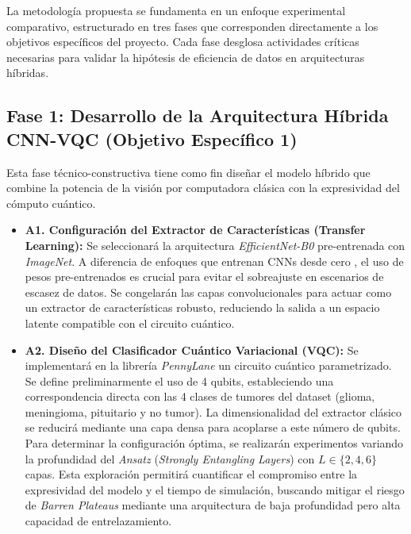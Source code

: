 \documentclass[12pt,letterpaper]{article}
\begin{document}
    La metodología propuesta se fundamenta en un enfoque experimental comparativo, estructurado en tres fases que corresponden directamente a los objetivos específicos del proyecto. Cada fase desglosa actividades críticas necesarias para validar la hipótesis de eficiencia de datos en arquitecturas híbridas.
    
    \subsection{Fase 1: Desarrollo de la Arquitectura Híbrida CNN-VQC (Objetivo Específico 1)}
    Esta fase técnico-constructiva tiene como fin diseñar el modelo híbrido que combine la potencia de la visión por computadora clásica con la expresividad del cómputo cuántico.
    
    \begin{itemize}
        \item \textbf{A1. Configuración del Extractor de Características (Transfer Learning):} Se seleccionará la arquitectura \textit{EfficientNet-B0} pre-entrenada con \textit{ImageNet}. A diferencia de enfoques que entrenan CNNs desde cero \citep{haddou2025hqcm}, el uso de pesos pre-entrenados es crucial para evitar el sobreajuste en escenarios de escasez de datos. Se congelarán las capas convolucionales para actuar como un extractor de características robusto, reduciendo la salida a un espacio latente compatible con el circuito cuántico.        

        \item \textbf{A2. Diseño del Clasificador Cuántico Variacional (VQC):} Se implementará en la librería \textit{PennyLane} un circuito cuántico parametrizado. Se define preliminarmente el uso de 4 qubits, estableciendo una correspondencia directa con las 4 clases de tumores del dataset (glioma, meningioma, pituitario y no tumor). La dimensionalidad del extractor clásico se reducirá mediante una capa densa para acoplarse a este número de qubits. Para determinar la configuración óptima, se realizarán experimentos variando la profundidad del \textit{Ansatz} (\textit{Strongly Entangling Layers}) con $L \in \{2, 4, 6\}$ capas. Esta exploración permitirá cuantificar el compromiso entre la expresividad del modelo y el tiempo de simulación, buscando mitigar el riesgo de \textit{Barren Plateaus} mediante una arquitectura de baja profundidad pero alta capacidad de entrelazamiento.
        

\end{itemize}
\end{document}
